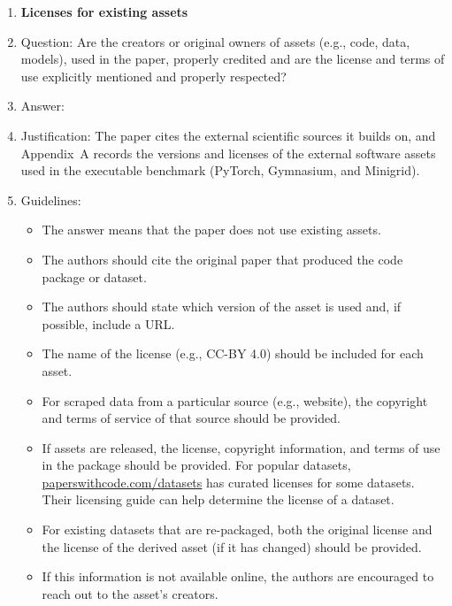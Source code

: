 \documentclass{article}
\begin{document}
\begin{enumerate}
\item {\bf Licenses for existing assets}
    \item[] Question: Are the creators or original owners of assets (e.g., code, data, models), used in the paper, properly credited and are the license and terms of use explicitly mentioned and properly respected?
    \item[] Answer: \answerYes{}
    \item[] Justification: The paper cites the external scientific sources it builds on, and Appendix~A records the versions and licenses of the external software assets used in the executable benchmark (PyTorch, Gymnasium, and Minigrid).
    \item[] Guidelines:
    \begin{itemize}
        \item The answer \answerNA{} means that the paper does not use existing assets.
        \item The authors should cite the original paper that produced the code package or dataset.
        \item The authors should state which version of the asset is used and, if possible, include a URL.
        \item The name of the license (e.g., CC-BY 4.0) should be included for each asset.
        \item For scraped data from a particular source (e.g., website), the copyright and terms of service of that source should be provided.
        \item If assets are released, the license, copyright information, and terms of use in the package should be provided. For popular datasets, \url{paperswithcode.com/datasets} has curated licenses for some datasets. Their licensing guide can help determine the license of a dataset.
        \item For existing datasets that are re-packaged, both the original license and the license of the derived asset (if it has changed) should be provided.
        \item If this information is not available online, the authors are encouraged to reach out to the asset's creators.
    \end{itemize}


\end{enumerate}
\end{document}
